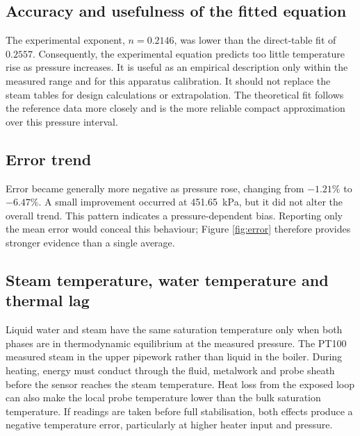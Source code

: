 \documentclass[11pt,a4paper]{article}
\begin{document}
\subsection{Accuracy and usefulness of the fitted equation}
The experimental exponent, $n=0.2146$, was lower than the direct-table fit of
$0.2557$. Consequently, the experimental equation predicts too little
temperature rise as pressure increases. It is useful as an empirical
description only within the measured range and for this apparatus calibration.
It should not replace the steam tables for design calculations or extrapolation.
The theoretical fit follows the reference data more closely and is the more
reliable compact approximation over this pressure interval.

\subsection{Error trend}
Error became generally more negative as pressure rose, changing from $-1.21\%$
to $-6.47\%$. A small improvement occurred at \SI{451.65}{\kilo\pascal}, but it
did not alter the overall trend. This pattern indicates a pressure-dependent
bias. Reporting only the mean error would conceal this behaviour; Figure
\ref{fig:error} therefore provides stronger evidence than a single average.

\subsection{Steam temperature, water temperature and thermal lag}
Liquid water and steam have the same saturation temperature only when both
phases are in thermodynamic equilibrium at the measured pressure. The PT100
measured steam in the upper pipework rather than liquid in the boiler. During
heating, energy must conduct through the fluid, metalwork and probe sheath before
the sensor reaches the steam temperature. Heat loss from the exposed loop can
also make the local probe temperature lower than the bulk saturation
temperature. If readings are taken before full stabilisation, both effects
produce a negative temperature error, particularly at higher heater input and
pressure.
\end{document}
